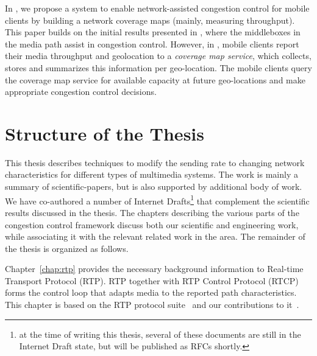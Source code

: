 In , we propose a system to enable network-assisted
congestion control for mobile clients by building a network coverage maps
(mainly, measuring throughput). This paper builds on the initial results
presented in , where the middleboxes in the media path assist
in congestion control. However, in , mobile clients report
their media throughput and geolocation to a \emph{coverage map service}, which
collects, stores and summarizes this information per geo-location. The mobile
clients query the coverage map service for available capacity at future
geo-locations and make appropriate congestion control decisions.

\section{Structure of the Thesis}

This thesis describes techniques to modify the sending rate to changing
network characteristics for different types of multimedia systems. The work is
mainly a summary of scientific-papers, but is also supported by additional
body of work. We have co-authored a number of Internet Drafts\footnote{at the
time of writing this thesis, several of these documents are still in the
Internet Draft state, but will be published as RFCs shortly.} that complement
the scientific results discussed in the thesis. The chapters describing the
various parts of the congestion control framework discuss both our scientific
and engineering work, while associating it with the relevant related work in
the area. The remainder of the thesis is organized as follows.



Chapter~\ref{chap:rtp} provides the necessary background information to 
Real-time Transport Protocol (RTP). RTP together with RTP Control Protocol (RTCP)
forms the control loop that adapts media to the reported path characteristics.
This chapter is based on the RTP protocol suite~\cite{rfc3550, rfc4585,
rfc3611, rfc5104, rfc5506} and our contributions to
it~\cite{rfc7097, rfc7005, draft.xr.bytes.discarded, draft.xr.post.repair}.


